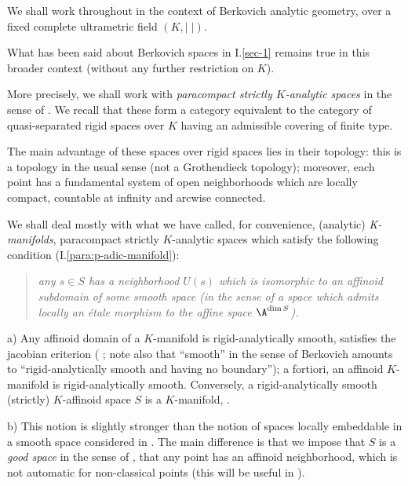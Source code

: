 \begin{para}\label{para::1.1.1}
 We shall work throughout in the context of Berkovich analytic geometry,
 over a fixed complete ultrametric field $(K,|\;|)$.

 What has been said about Berkovich spaces in I.\ref{sec-1} remains true
 in this broader context (\ie without any further restriction on
 $K$). 

 More precisely, we shall work with {\it paracompact strictly
 $K$-analytic spaces} in the sense of \cite{ecfnas}. We recall that these
 form a category equivalent to the category of quasi-separated rigid
 spaces over $K$ having an admissible covering of finite type.

 The main
 advantage of these spaces over rigid spaces lies in their topology: this
 is a topology in the usual sense (not a Grothendieck topology);
 moreover, each point has a fundamental system of open neighborhoods
 which are locally compact, countable at infinity and arcwise connected.

 We shall deal mostly with what we have called, for convenience,
 (analytic) {\it K-manifolds}, \ie 
 paracompact strictly $K$-analytic spaces which satisfy the following
 condition (I.\ref{para:p-adic-manifold}):
 
\begin{quote}
 {\it any $s\in S$ has a neighborhood $U(s)$ which is isomorphic 
 to an affinoid subdomain of some smooth space (in the sense of \cite{ecfnas}
 \ie a space which admits locally an \'etale morphism to the affine space 
  $\A^{\dim S}$).}
\end{quote}

\begin{rems}\label{rems:1.1.1.5}
 a) Any affinoid domain of a $K$-manifold is
 rigid-analytically smooth, \ie satisfies the jacobian criterion (\cf
 \cite[2.2]{ecfnas}; note also that ``smooth'' in the sense of Berkovich
 amounts to ``rigid-analytically smooth and having no boundary''); a
 fortiori, an affinoid $K$-manifold is rigid-analytically
 smooth.  Conversely, a rigid-analytically smooth (strictly) $K$-affinoid
 space $S$ is a $K$-manifold, \cf \cite[rem. 9.7]{spasalc}.

 b) This notion is slightly stronger than the notion of spaces
 locally embeddable in a smooth space considered in \cite{spasalc}. The
 main difference is that we impose that $S$ is a {\it good space} in the
 sense of \cite{ecfnas}, \ie that any point has an affinoid
 neighborhood, which is not automatic for non-classical points (this
 will be useful in ).


\end{rems}
\end{para}
